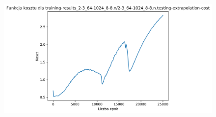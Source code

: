 \documentclass{classrep}
\begin{document}
{{\begin{figure}[!htbp]
            \end{figure}
            \begin{figure}[!htbp]
                \centering
                \includegraphics[width=140mm]{wykresy/2-3_64-1024_8-8_n_testing-extrapolation-cost.png}
            \end{figure}
            \FloatBarrier
        }
}
\end{document}
